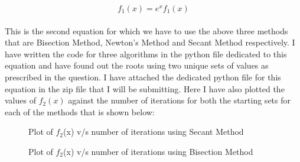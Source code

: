 \documentclass[12pt,a4paper]{article}
\begin{document}
\begin{equation}
	\text{$f_1$}(x) = \text{$e^x f_1(x)$}
\end{equation}
\\This is the second equation for which we have to use the above three methods that are Bisection Method, Newton's Method and Secant Method respectively. I have written the code for  three algorithms in the python file dedicated to this equation  and have found out the roots using two unique sets of values as prescribed in the question. I have attached the dedicated python file for this equation in the zip file that I will be submitting. Here I have also plotted the values of $\text{$f_2$}(x)$ against the number of iterations for both the starting sets for each of the methods that is shown below:
\clearpage
\begin{figure}[!ht]
	\begin{center}
	\end{center}
	\caption{Plot of $f_2$(x) v/s number of iterations using Secant Method}
\end{figure}
\begin{figure}[!ht]
	\begin{center}
	\end{center}
	\caption{Plot of $f_2$(x) v/s number of iterations using Bisection Method}
\end{figure}
\end{document}
